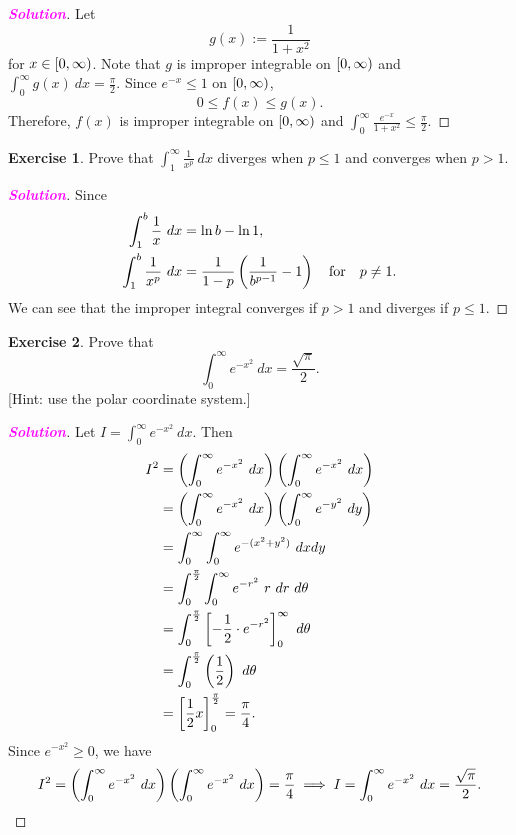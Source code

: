 \documentclass[12pt,openany]{book}
\theoremstyle{definition}
\newtheorem{exercise}{Exercise}[chapter]
\newcommand{\sol}{\textcolor{magenta}{\bf Solution}}
\begin{document}
	\begin{proof}[\sol]
		
		Let \[
		g(x):=\frac{1}{1+x^2}
		\] for $x\in\intco{0,\infty}$. Note that $g$ is improper integrable on $\intco{0,\infty}$ and $\int_0^\infty g(x)\ dx =\frac{\pi}{2}$.  Since $e^{-x}\leq 1$ on $\intco{0,\infty}$, \[
		0\leq f(x)\leq g(x).
		\] Therefore, $f(x)$ is improper integrable on $\intco{0,\infty}$ and $\int_0^\infty\frac{e^{-x}}{1+x^2}\leq\frac{\pi}{2}$.
	\end{proof}
	\vspace{15pt}
	\begin{tcolorbox}[colframe=execolor, title={\color{white}\bf}]
		\begin{exercise}
			Prove that $\displaystyle\int_1^{\infty}\frac{1}{x^p}\ dx$ diverges when $p\leq 1$ and converges when $p>1$.
		\end{exercise}
	\end{tcolorbox}
	\begin{proof}[\sol]
		Since \begin{align*}
			\int_1^b\frac{1}{x}\ dx &= \ln b - \ln 1,\\
			\int_1^b\frac{1}{x^p}\ dx &= \frac{1}{1-p}\del{\frac{1}{b^{p-1}}-1}\quad\text{for}\quad p\neq 1.
		\end{align*} We can see that the improper integral converges if $p>1$ and diverges if $p\leq 1$.
	\end{proof}
	\vspace{15pt}
	\begin{tcolorbox}[colframe=execolor, title={\color{white}\bf}]
		\begin{exercise}
			Prove that \[
			\int_0^\infty e^{-x^2}\ dx =\frac{\sqrt{\pi}}{2}.
			\]
			\textcolor{gray!50!white}{[Hint: use the polar coordinate system.]}
		\end{exercise}
	\end{tcolorbox}
	\begin{proof}[\sol]
		Let $\displaystyle I=\int_0^\infty e^{-x^2}\ dx$. Then \begin{align*}
			I^2&=\del{\int_0^\infty e^{-x^2}\ dx}\del{\int_0^\infty e^{-x^2}\ dx}\\
			&=\del{\int_0^\infty e^{-x^2}\ dx}\del{\int_0^\infty e^{-y^2}\ dy}\\
			&=\int_0^\infty\int_0^\infty e^{-(x^2+y^2)}\ dxdy\\
			&=\int_0^{\frac{\pi}{2}}\int_0^\infty e^{-r^2}\ r\ dr\ d\theta\\
			&=\int_0^{\frac{\pi}{2}}\sbr{-\frac{1}{2}\cdot e^{-r^2}}_0^\infty\ d\theta\\
			&=\int_0^{\frac{\pi}{2}}\del{\frac{1}{2}}\ d\theta\\
			&=\sbr{\frac{1}{2}x}_0^{\frac{\pi}{2}}=\frac{\pi}{4}.
		\end{align*}
		Since $e^{-x^2}\geq 0$, we have \[
		I^2=\del{\int_0^\infty e^{-x^2}\ dx}\del{\int_0^\infty e^{-x^2}\ dx}=\frac{\pi}{4}\implies I=\int_0^\infty e^{-x^2}\ dx=\frac{\sqrt{\pi}}{2}.
		\]
	\end{proof}
\end{document}
